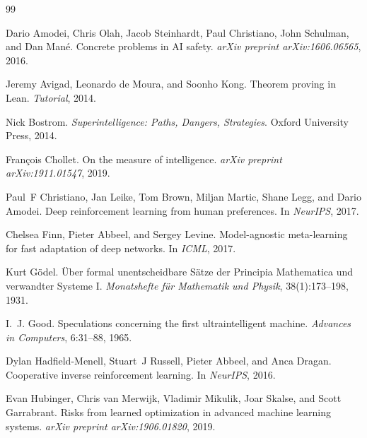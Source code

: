 \documentclass[11pt,letterpaper]{article}
\begin{document}

\begin{thebibliography}{99}

Dario Amodei, Chris Olah, Jacob Steinhardt, Paul Christiano, John Schulman, and Dan Mané.
\newblock Concrete problems in AI safety.
\newblock \emph{arXiv preprint arXiv:1606.06565}, 2016.

Jeremy Avigad, Leonardo de Moura, and Soonho Kong.
\newblock Theorem proving in Lean.
\newblock \emph{Tutorial}, 2014.

Nick Bostrom.
\newblock \emph{Superintelligence: Paths, Dangers, Strategies}.
\newblock Oxford University Press, 2014.

François Chollet.
\newblock On the measure of intelligence.
\newblock \emph{arXiv preprint arXiv:1911.01547}, 2019.

Paul~F Christiano, Jan Leike, Tom Brown, Miljan Martic, Shane Legg, and Dario Amodei.
\newblock Deep reinforcement learning from human preferences.
\newblock In \emph{NeurIPS}, 2017.

Chelsea Finn, Pieter Abbeel, and Sergey Levine.
\newblock Model-agnostic meta-learning for fast adaptation of deep networks.
\newblock In \emph{ICML}, 2017.

Kurt Gödel.
\newblock Über formal unentscheidbare Sätze der Principia Mathematica und verwandter Systeme I.
\newblock \emph{Monatshefte für Mathematik und Physik}, 38(1):173--198, 1931.

I.~J. Good.
\newblock Speculations concerning the first ultraintelligent machine.
\newblock \emph{Advances in Computers}, 6:31--88, 1965.

Dylan Hadfield-Menell, Stuart~J Russell, Pieter Abbeel, and Anca Dragan.
\newblock Cooperative inverse reinforcement learning.
\newblock In \emph{NeurIPS}, 2016.

Evan Hubinger, Chris van Merwijk, Vladimir Mikulik, Joar Skalse, and Scott Garrabrant.
\newblock Risks from learned optimization in advanced machine learning systems.
\newblock \emph{arXiv preprint arXiv:1906.01820}, 2019.


\end{thebibliography}
\end{document}

